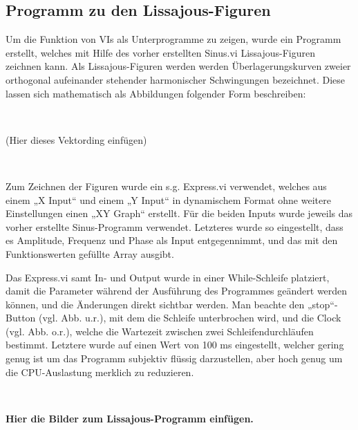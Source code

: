 \subsection{Programm zu den Lissajous-Figuren}

Um die Funktion von VIs als Unterprogramme zu zeigen, wurde ein Programm erstellt, welches mit Hilfe des vorher erstellten Sinus.vi Lissajous-Figuren zeichnen kann. Als Lissajous-Figuren werden werden Überlagerungskurven zweier orthogonal aufeinander stehender harmonischer Schwingungen bezeichnet. Diese lassen sich mathematisch als Abbildungen folgender Form beschreiben:

\

(Hier dieses Vektording einfügen)

\

Zum Zeichnen der Figuren wurde ein s.g. Express.vi verwendet, welches aus einem „X Input“ und einem „Y Input“ in dynamischem Format ohne weitere Einstellungen einen „XY Graph“ erstellt. Für die beiden Inputs wurde jeweils das vorher erstellte Sinus-Programm verwendet. Letzteres wurde so eingestellt, dass es Amplitude, Frequenz und Phase als Input entgegennimmt, und das mit den Funktionswerten gefüllte Array ausgibt.

Das Express.vi samt In- und Output wurde in einer While-Schleife platziert, damit die Parameter während der Ausführung des Programmes geändert werden können, und die Änderungen direkt sichtbar werden. Man beachte den „stop“-Button (vgl. Abb. u.r.), mit dem die Schleife unterbrochen wird, und die Clock (vgl. Abb. o.r.), welche die Wartezeit zwischen zwei Schleifendurchläufen bestimmt. Letztere wurde auf einen Wert von 100 ms eingestellt, welcher gering genug ist um das Programm subjektiv flüssig darzustellen, aber hoch genug um die CPU-Auslastung merklich zu reduzieren.

\

\textbf{Hier die Bilder zum Lissajous-Programm einfügen.}